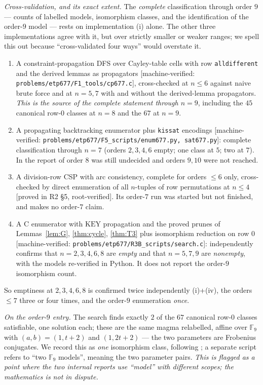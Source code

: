 \documentclass[11pt]{article}
\theoremstyle{plain}
\theoremstyle{definition}
\theoremstyle{remark}
\numberwithin{equation}{section}
\newcommand{\F}{\mathbb{F}}
\newcommand{\statusbox}[1]{{\small\sloppy\textsf{[#1]}}}
\newcommand{\MV}[1]{\statusbox{machine-verified: \texttt{#1}}}
\newcommand{\PROVED}[1]{\statusbox{proved in #1, root-verified}}
\begin{document}
\emph{Cross-validation, and its exact extent.}\label{sec:crossval}
The \emph{complete} classification through order $9$ --- counts of labelled models,
isomorphism classes, and the identification of the order-$9$ model --- rests on
implementation (i) alone. The other three implementations agree with it, but over
strictly smaller or weaker ranges; we spell this out because ``cross-validated four ways''
would overstate it.
\begin{enumerate}
\item[(i)] A constraint-propagation
DFS over Cayley-table cells with row \texttt{alldifferent} and the derived lemmas as
propagators \MV{problems\slash etp677\slash F1\_tools\slash cp677.c}, cross-checked at $n\le6$ against naive
brute force and at $n=5,7$ with and without the derived-lemma propagators. \emph{This is the
source of the complete statement through $n = 9$}, including the $45$ canonical row-$0$
classes at $n=8$ and the $67$ at $n=9$.
\item[(ii)] A propagating
backtracking enumerator plus \texttt{kissat} encodings \MV{problems\slash etp677\slash F5\_scripts\slash enum677.py, sat677.py}:
complete classification through $n = 7$ (orders $2,3,4,6$ empty; one class at $5$; two at
$7$). In the report of \cite{F5} order $8$ was still undecided and orders $9,10$ were not
reached.
\item[(iii)] A division-row CSP with arc consistency, complete for orders $\le6$ only,
cross-checked by direct
enumeration of all $n$-tuples of row permutations at $n\le4$ \PROVED{R2 \S5}. Its order-$7$
run was started but not finished, and \cite{R2} makes no order-$7$ claim.
\item[(iv)] A C
enumerator with $\mathrm{KEY}$ propagation and the proved prunes of
Lemmas~\ref{lem:G}, \ref{thm:cycle}, \ref{thm:T3} plus isomorphism reduction on row $0$
\MV{problems\slash etp677\slash R3B\_scripts\slash search.c}: independently confirms that
$n = 2,3,4,6,8$ are \emph{empty} and that $n = 5,7,9$ are \emph{nonempty}, with the models
re-verified in Python. It does not report the order-$9$ isomorphism count.
\end{enumerate}
So emptiness at $2,3,4,6,8$ is confirmed twice independently (i)+(iv), the orders $\le 7$
three or four times, and the order-$9$ enumeration \emph{once}.

\emph{On the order-$9$ entry.} The search finds exactly $2$ of the $67$ canonical row-$0$
classes satisfiable, one solution each; these are the same magma relabelled, affine over
$\F_9$ with $(a,b) = (1,t+2)$ and $(1,2t+2)$ --- the two parameters are Frobenius conjugates.
We record this as \emph{one} isomorphism class, following \cite{F1}; a separate script
\cite{R3B} refers to ``two $\F_9$ models'', meaning the two parameter pairs. \emph{This is
flagged as a point where the two internal reports use ``model'' with different scopes; the
mathematics is not in dispute.}
\end{document}

